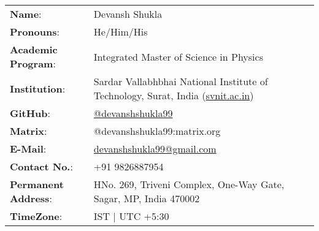 \begin{tabular}{P{0.25\textwidth} P{0.7\textwidth}}
    \textbf{Name}: & Devansh Shukla \\
    \textbf{Pronouns}: & He/Him/His \\
    \textbf{Academic Program}: & Integrated Master of Science in Physics \\
    \textbf{Institution}: & Sardar Vallabhbhai National Institute of Technology, Surat, India (\href{https://www.svnit.ac.in}{svnit.ac.in}) \\
    \textbf{GitHub}: & \href{https://www.github.com/devanshshukla99}{@devanshshukla99} \\
    \textbf{Matrix}: & @devanshshukla99:matrix.org \\
    \textbf{E-Mail}: & \href{mailto:devanshshukla99@gmail.com}{devanshshukla99@gmail.com} \\
    \textbf{Contact No.}: & +91 9826887954 \\
    \textbf{Permanent Address}: & HNo. 269, Triveni Complex, One-Way Gate, Sagar, MP, India 470002 \\
    \textbf{TimeZone}: & IST | UTC +5:30 \\
\end{tabular}